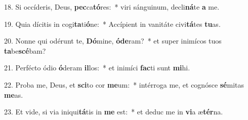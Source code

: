 18. Si occíderis, Deus, \textbf{pec}ca\textbf{tó}res:~*  viri sánguinum, decli\textbf{ná}te \textbf{a} me.\

19. Quia dícitis in cogi\textbf{ta}ti\textbf{ó}ne:~*  Accípient in vanitáte civi\textbf{tá}tes \textbf{tu}as.\

20. Nonne qui odérunt te, \textbf{Dó}mine, \textbf{ó}\textbf{de}ram?~*  et super inimícos tuos \textbf{ta}be\textbf{scé}bam?\

21. Perfécto ódio \textbf{ó}deram \textbf{il}los:~*  et inimíci \textbf{fac}ti sunt \textbf{mi}hi.\

22. Proba me, Deus, et \textbf{sci}to cor \textbf{me}um:~*  intérroga me, et cognósce \textbf{sé}mitas \textbf{me}as.\

23. Et vide, si via iniqui\textbf{tá}tis in \textbf{me} est:~*  et deduc me in \textbf{vi}a æ\textbf{tér}na.\

